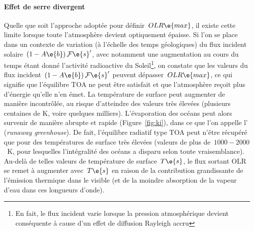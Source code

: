
\sk
\paragraph{Effet de serre divergent} 
Quelle que soit l'approche adoptée pour définir~$OLR\e{max}$,
il existe cette limite lorsque toute l'atmosphère devient optiquement épaisse.
Si l'on se place dans un contexte de variation
(à l'échelle des temps géologiques) du flux incident
solaire~$(1-A\e{b}) \, \mathcal{F}\e{s}'$,
avec notamment une augmentation au cours du temps
étant donné l'activité radioactive du Soleil\footnote{En fait, le flux incident varie lorsque la pression atmosphérique devient conséquente à cause d'un effet de diffusion Rayleigh accru},
on constate que les valeurs du flux 
incident~$(1-A\e{b}) \, \mathcal{F}\e{s}'$ peuvent
dépasser~$OLR\e{max}$, ce qui signifie que
l'équilibre TOA ne peut être satisfait et que
l'atmosphère reçoit plus d'énergie qu'elle
n'en émet. La température de surface peut augmenter
de manière incontrôlée, au risque d'atteindre des valeurs
très élevées (plusieurs centaines de K, voire quelques milliers).
L'évaporation des océans peut alors
survenir de manière abrupte et rapide (Figure~\ref{fig:ki}),
dans ce que l'on appelle l'
(\emph{runaway greenhouse}). De fait, 
l'équilibre radiatif type TOA peut n'être
récupéré que pour des températures de surface 
très élevées (valeurs de plus de~$1000-2000$~K,
pour lesquelles l'intégralité des océans a disparu
selon toute vraisemblance).
Au-delà de telles valeurs de température de surface~$T\e{s}$,
le flux sortant OLR se remet à augmenter avec~$T\e{s}$
en raison de la contribution grandissante de l'émission
thermique dans le visible (et de la moindre absorption
de la vapeur d'eau dans ces longueurs d'onde).





